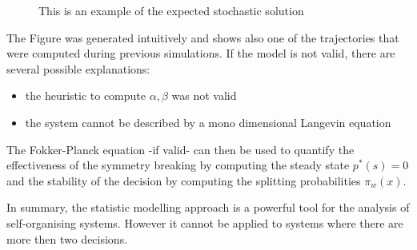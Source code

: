 \begin{figure}[htbp]
\begin{center}
\end{center}
\vspace*{4pt}
\caption[Expected result of simmetry]{
This is an example of the expected stochastic solution \label{fig:conclusion:simmetryexpected}}
\end{figure}

The Figure was generated intuitively and shows also one of the
trajectories that were computed during previous simulations.
If the model is not valid, there are several possible explanations:
\begin{itemize}
 \item the heuristic to compute $\alpha,\beta$ was not valid
 \item the system cannot be described by a mono dimensional Langevin equation
\end{itemize}
The Fokker-Planck equation -if valid- can then be used to quantify
the effectiveness of the symmetry breaking by computing the steady state $p^*(s)=0$
and the stability of the decision by computing the splitting probabilities $\pi_w(x)$.

In summary, the statistic modelling approach is a powerful tool for the analysis
of self-organising systems.
However it cannot be applied to systems where there are more then
two decisions. 